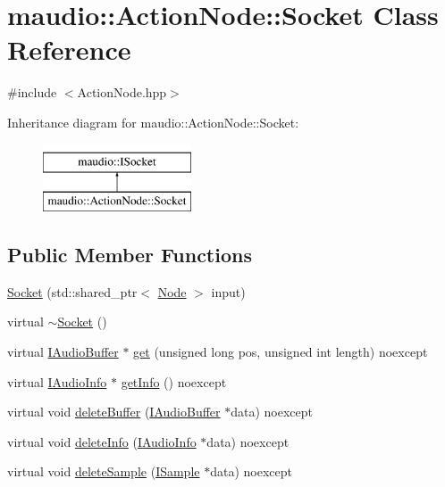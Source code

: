 \hypertarget{classmaudio_1_1ActionNode_1_1Socket}{\section{maudio\-:\-:Action\-Node\-:\-:Socket Class Reference}
\label{classmaudio_1_1ActionNode_1_1Socket}
}


{\ttfamily \#include $<$Action\-Node.\-hpp$>$}

Inheritance diagram for maudio\-:\-:Action\-Node\-:\-:Socket\-:\begin{figure}[H]
\begin{center}
\leavevmode
\includegraphics[height=2.000000cm]{classmaudio_1_1ActionNode_1_1Socket}
\end{center}
\end{figure}
\subsection*{Public Member Functions}
\begin{DoxyCompactItemize}
\item 
\hyperlink{classmaudio_1_1ActionNode_1_1Socket_a3c1f70a4d60050e19cf3ecb441068653}{Socket} (std\-::shared\-\_\-ptr$<$ \hyperlink{classmaudio_1_1Node}{Node} $>$ input)
\item 
virtual \hyperlink{classmaudio_1_1ActionNode_1_1Socket_a184298687b5653972217b83afe6425d9}{$\sim$\-Socket} ()
\item 
virtual \hyperlink{classmaudio_1_1IAudioBuffer}{I\-Audio\-Buffer} $\ast$ \hyperlink{classmaudio_1_1ActionNode_1_1Socket_a3801dbf1ff87f6f4d417d2929ff3c107}{get} (unsigned long pos, unsigned int length) noexcept
\item 
virtual \hyperlink{classmaudio_1_1IAudioInfo}{I\-Audio\-Info} $\ast$ \hyperlink{classmaudio_1_1ActionNode_1_1Socket_adf54bb1504b5cf9d53fe6529e86e3653}{get\-Info} () noexcept
\item 
virtual void \hyperlink{classmaudio_1_1ActionNode_1_1Socket_a8a64ba64966caca18a70c711ff1e4b2d}{delete\-Buffer} (\hyperlink{classmaudio_1_1IAudioBuffer}{I\-Audio\-Buffer} $\ast$data) noexcept
\item 
virtual void \hyperlink{classmaudio_1_1ActionNode_1_1Socket_a3e25c1d6d28ecbfdfeecd6b6c846a1be}{delete\-Info} (\hyperlink{classmaudio_1_1IAudioInfo}{I\-Audio\-Info} $\ast$data) noexcept
\item 
virtual void \hyperlink{classmaudio_1_1ActionNode_1_1Socket_a8882eaaf8ea9d06ea006c6d977acdeb7}{delete\-Sample} (\hyperlink{classmaudio_1_1ISample}{I\-Sample} $\ast$data) noexcept
\end{DoxyCompactItemize}


